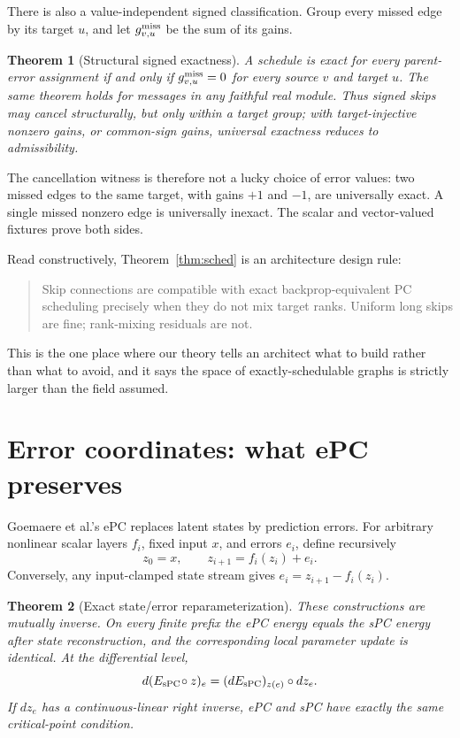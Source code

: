 \documentclass[11pt]{article}
\newtheorem{theorem}{Theorem}[section]
\begin{document}
There is also a value-independent signed classification. Group every missed edge by its
target $u$, and let $g_{v,u}^{\rm miss}$ be the sum of its gains.

\begin{theorem}[Structural signed exactness]\label{thm:structsigned}
A schedule is exact for \emph{every} parent-error assignment if and only if
$g_{v,u}^{\rm miss}=0$ for every source $v$ and target $u$. The same theorem holds for
messages in any faithful real module. Thus signed skips may cancel structurally, but
only within a target group; with target-injective nonzero gains, or common-sign gains,
universal exactness reduces to admissibility.
\end{theorem}

The cancellation witness is therefore not a lucky choice of error values: two missed
edges to the same target, with gains $+1$ and $-1$, are universally exact. A single
missed nonzero edge is universally inexact. The scalar and vector-valued fixtures prove
both sides.

Read constructively, Theorem~\ref{thm:sched} is an architecture design rule:

\begin{quote}
Skip connections are compatible with exact backprop-equivalent PC scheduling precisely
when they do not mix target ranks. Uniform long skips are fine; rank-mixing residuals
are not.
\end{quote}

This is the one place where our theory tells an architect what to build rather than what
to avoid, and it says the space of exactly-schedulable graphs is strictly larger than
the field assumed.

\section{Error coordinates: what ePC preserves}
\label{sec:epc}

Goemaere et al.'s ePC \cite{goemaere2025} replaces latent states by prediction errors.
For arbitrary nonlinear scalar layers $f_i$, fixed input $x$, and errors $e_i$, define
recursively
\[
z_0=x,\qquad z_{i+1}=f_i(z_i)+e_i.
\]
Conversely, any input-clamped state stream gives
$e_i=z_{i+1}-f_i(z_i)$.

\begin{theorem}[Exact state/error reparameterization]\label{thm:epc}
These constructions are mutually inverse. On every finite prefix the ePC energy equals
the sPC energy after state reconstruction, and the corresponding local parameter update
is identical. At the differential level,
\[
d(E_{\rm sPC}\!\circ z)_e=(dE_{\rm sPC})_{z(e)}\circ dz_e.
\]
If $dz_e$ has a continuous-linear right inverse, ePC and sPC have exactly the same
critical-point condition.
\end{theorem}
\end{document}
